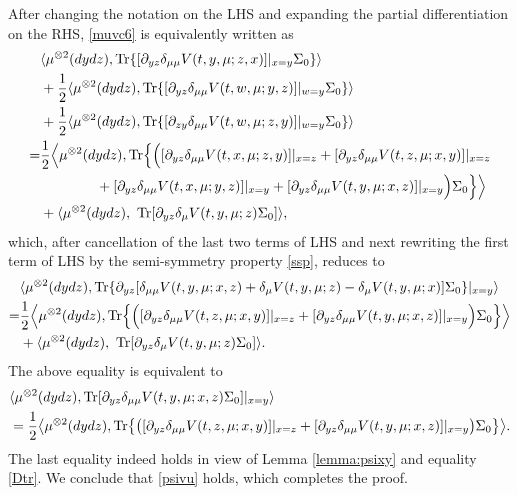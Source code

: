 \documentclass{amsart}
\theoremstyle{definition}
\theoremstyle{remark}
\def\D{\partial}
\numberwithin{equation}{section}
\begin{document}
 After changing the notation on the  LHS and expanding the partial differentiation on the RHS, \eqref{muvc6} is equivalently written as
\begin{align*}
& \langle \mu^{\otimes2}(dydz), {\rm Tr}\{ [ \D_{yz}\delta_{\mu\mu} V(t,y, \mu;z,x)]|_{x=y}  \Sigma_0 \}\rangle \notag  \\
& + \frac{1}{2}\langle\mu^{\otimes2}(dydz), {\rm Tr}\{[\D_{yz}\delta_{\mu\mu} V (t, w, \mu; y,z)]|_{w=y}
\Sigma_0\}\rangle\\
&  +\frac{1}{2}\langle\mu^{\otimes2}(dydz), {\rm Tr}\{[\D_{zy}\delta_{\mu\mu} V (t, w, \mu; z,y)]|_{w=y}
\Sigma_0\}\rangle\\
=&\frac12\Big\langle\mu^{\otimes2}(dydz), {\rm Tr}\Big\{ \Big( [\partial_{yz}
  \delta_{\mu\mu}  V(t, x,\mu; z,y)]|_{x=z} +[\partial_{yz} \delta_{\mu\mu}  V(t, z,\mu; x,y)]|_{x=z}\\
  &\qquad\qquad +[\partial_{yz} \delta_{\mu\mu}  V(t, x,\mu; y,z)]|_{x=y} +[\partial_{yz}\delta_{\mu\mu}  V(t, y,\mu; x,z)]|_{x=y}  \Big)\Sigma_0\Big\}\Big\rangle \\
&+ \langle \mu^{\otimes2}(dydz), \  {\rm Tr} [ \partial_{yz}
  \delta_{\mu}  V(t, y,\mu;z)\Sigma_0 ]  \rangle,
\end{align*}
which, after cancellation of the last two terms of LHS and next rewriting the first term of LHS  by the semi-symmetry property \eqref{ssp}, reduces to
\begin{align*}
& \langle \mu^{\otimes2}(dydz), {\rm Tr}\{ \D_{yz}[\delta_{\mu\mu} V(t,y, \mu;x,z)  +\delta_{\mu} V(t,y,\mu;z) - \delta_{\mu} V(t,y,\mu;x)  ]  \Sigma_0 \}|_{x=y}\rangle \notag  \\
=&\frac12\Big\langle\mu^{\otimes2}(dydz), {\rm Tr} \Big\{\Big( [\partial_{yz} \delta_{\mu\mu}  V(t, z,\mu; x,y)]|_{x=z}  +[\partial_{yz}\delta_{\mu\mu}  V(t, y,\mu; x,z)]|_{x=y}  \Big)\Sigma_0\Big\}\Big\rangle \\
&+ \langle \mu^{\otimes2}(dydz), \  {\rm Tr[}  \partial_{yz}
  \delta_{\mu}  V(t, y,\mu;z)\Sigma_0   ]\rangle.
\end{align*}
The above equality is equivalent to
\begin{align*}
& \langle \mu^{\otimes2}(dydz), {\rm Tr}[ \D_{yz}\delta_{\mu\mu} V(t,y, \mu;x,z)     \Sigma_0 ]|_{x=y}\rangle \notag  \\
 &=\frac12\big\langle\mu^{\otimes2}(dydz), {\rm Tr}\big\{ \big( [\partial_{yz} \delta_{\mu\mu}  V(t, z,\mu; x,y)]|_{x=z}  +[\partial_{yz}\delta_{\mu\mu}  V(t, y,\mu; x,z)]|_{x=y}  \big)\Sigma_0\big\}\big\rangle .
\end{align*}
The last equality indeed holds in view of Lemma \ref{lemma:psixy} and equality \eqref{Dtr}.
We conclude that \eqref{psivu} holds, which completes the proof.
\end{document}

